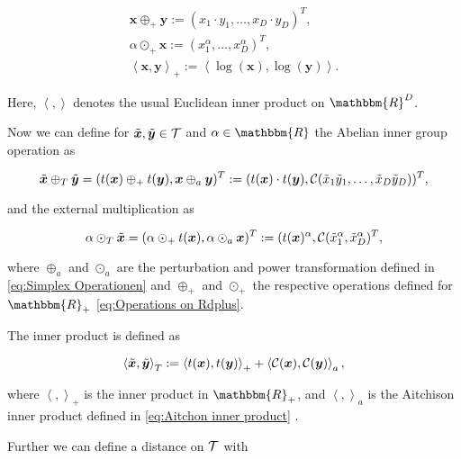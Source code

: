 \begin{gather}
\bm{x} \oplus_+ \bm{y}:= (x_1\cdot y_1,\ldots,x_D \cdot y_D)^T, \\
\alpha \odot_+ \bm{x} := (x_1^{\alpha},\ldots,x_D^{\alpha})^T, \\
\left\langle \bm{x},\bm{y} \right\rangle_+ := \left\langle \log(\bm{x}),\log(\bm{y}) \right\rangle.
\label{eq:Operations on Rdplus}
\end{gather}

Here, $\left\langle ,\right\rangle$ denotes the usual Euclidean inner product on $\mathbbm{R}^D$. 

Now we can define for $\tilde{\bm{x}},\tilde{\bm{y}} \in \mathcal{T}$ and $\alpha \in \mathbbm{R}$ the Abelian inner group operation as 

\begin{equation}
\tilde{\bm{x}} \oplus_T \tilde{\bm{y}} = (t(\bm{x}) \oplus_+ t(\bm{y}), \bm{x} \oplus_a \bm{y})^T := (t(\bm{x}) \cdot t(\bm{y}), \mathcal{C}(\tilde{x}_1\tilde{y}_1,\ldots,\tilde{x}_D\tilde{y}_D))^T,
\label{eq:Abelian inner group operation}
\end{equation}

and the external multiplication as 

\begin{equation}
\alpha \odot_T \tilde{\bm{x}} = (\alpha \odot_+ t(\bm{x}), \alpha \odot_a \bm{x})^T := (t(\bm{x})^{\alpha},\mathcal{C}(\tilde{x}_1^{\alpha},\tilde{x}_D^{\alpha})^T,
\label{eq:external multiplication}
\end{equation}

where $\oplus_a$ and $\odot_a$ are the perturbation and power transformation defined in \ref{eq:Simplex Operationen} and $\oplus_+$ and $\odot_+$ the respective operations defined for $\mathbbm{R}_+$ \ref{eq:Operations on Rdplus}.

The inner product is defined as 

\begin{equation}
\left\langle \tilde{\bm{x}},\tilde{\bm{y}} \right\rangle_T := \left\langle t(\bm{x}),t(\bm{y}) \right\rangle_+ + \left\langle \mathcal{C}(\bm{x}),\mathcal{C}(\bm{y}) \right\rangle_a,
\label{eq:inner product Tspace}
\end{equation}

where $\left\langle ,\right\rangle_+$ is the inner product in $\mathbbm{R}_+$, and $\left\langle ,\right\rangle_a$ is the Aitchison inner product defined in \ref{eq:Aitchon inner product} \cite{Pawlowsky:2013}.

Further we can define a distance on $\mathcal{T}$ with 

